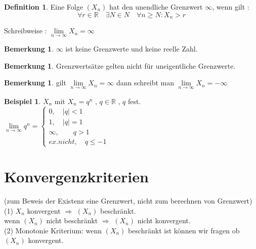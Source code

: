 \documentclass[a4paper,12pt,leqno]{report}
\theoremstyle{plain} %
\theoremstyle{definition} %
\newtheorem{remark}[theorem]{Bemerkung}
\newtheorem{definition}[theorem]{Definition}
\newtheorem{example}[theorem]{Beispiel}
\begin{document}
\begin{definition}
Eine Folge $(X_n)$ hat den unendliche Grenzwert $\infty$, wenn gilt : \\
\[\forall r \in \mathbb{R} \quad \exists N \in N \quad \forall n \geq N : X_n > r \]

Schreibweise : $\lim\limits_{n \rightarrow \infty}{X_n}= \infty$  
\end{definition}

\begin{remark}
$\infty$ ist keine Grenzwerte und keine reelle Zahl.    
\end{remark}

\begin{remark}
Grenzwertsätze gelten nicht für uneigentliche Grenzwerte.     
\end{remark}

\begin{remark}
gilt $\lim\limits_{n \rightarrow \infty}{X_n}= \infty$ dann schreibt man $\lim\limits_{n \rightarrow \infty}{X_n}= -\infty$
\end{remark}

\begin{example}
$X_n$ mit $X_n = q^n$ , $q \in \mathbb{R}$ , $q$ fest.\\

$ \lim\limits_{n \rightarrow \infty}{q^n} = \begin{cases}
0 ,\quad |q|<1 \\ 
1 ,\quad |q|=1 \\
\infty ,\quad\quad q > 1  \\ 
ex. nicht ,\quad q\leq -1 
\end{cases}$
\end{example}


\section{Konvergenzkriterien}
(zum Beweis der Existenz eine Grenzwert, nicht zum berechnen von Grenzwert) \\


(1) $X_n$ konvergent $\Rightarrow$ $(X_n)$ beschränkt. \\

wenn $(X_n)$ nicht beschränkt $\Rightarrow$ $(X_n)$ nicht konvergent.\\


(2) Monotonie Kriterium:
wenn $(X_n)$ beschränkt ist können wir fragen ob $(X_n)$    konvergent.\\
\end{document}
